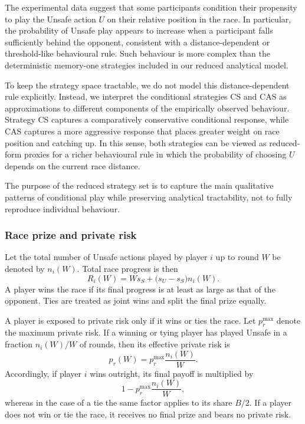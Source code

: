 \documentclass[pdflatex,sn-mathphys-ay]{sn-jnl}
\theoremstyle{thmstyleone}
\theoremstyle{thmstyletwo}
\theoremstyle{thmstylethree}
\begin{document}
The experimental data suggest that some participants condition their propensity to play the Unsafe action \(U\) on their relative position in the race. In particular, the probability of Unsafe play appears to increase when a participant falls sufficiently behind the opponent, consistent with a distance-dependent or threshold-like behavioural rule. Such behaviour is more complex than the deterministic memory-one strategies included in our reduced analytical model.

To keep the strategy space tractable, we do not model this distance-dependent rule explicitly. Instead, we interpret the conditional strategies CS and CAS as approximations to different components of the empirically observed behaviour. Strategy CS captures a comparatively conservative conditional response, while CAS captures a more aggressive response that places greater weight on race position and catching up. In this sense, both strategies can be viewed as reduced-form proxies for a richer behavioural rule in which the probability of choosing \(U\) depends on the current race distance.

The purpose of the reduced strategy set is to capture the main qualitative patterns of conditional play while preserving analytical tractability, not to fully reproduce individual behaviour.

\subsubsection{Race prize and private risk}

Let the total number of Unsafe actions played by player \(i\) up to round \(W\) be denoted by \(n_i(W)\). Total race progress is then
\[
R_i(W)=Ws_S + \bigl(s_U-s_S\bigr)n_i(W).
\]
A player wins the race if its final progress is at least as large as that of the opponent. Ties are treated as joint wins and split the final prize equally.

A player is exposed to private risk only if it wins or ties the race. Let \(p_r^{\max}\) denote the maximum private risk. If a winning or tying player has played Unsafe in a fraction \(n_i(W)/W\) of rounds, then its effective private risk is
\[
p_r(W)=p_r^{\max}\frac{n_i(W)}{W}.
\]
Accordingly, if player \(i\) wins outright, its final payoff is multiplied by
\[
1-p_r^{\max}\frac{n_i(W)}{W},
\]
whereas in the case of a tie the same factor applies to its share \(B/2\). If a player does not win or tie the race, it receives no final prize and bears no private risk.
\end{document}
